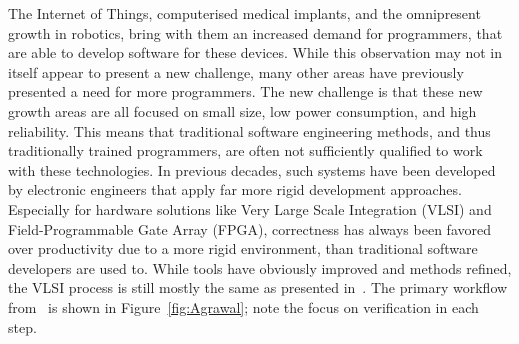 The Internet of Things, computerised medical implants, and the omnipresent growth in robotics, bring with them an increased demand for programmers, that are able to develop software for these devices. While this observation may not in itself appear to present a new challenge, many other areas have previously presented a need for more programmers. The new challenge is that these new growth areas are all focused on small size, low power consumption, and high reliability. This means that traditional software engineering methods, and thus traditionally trained programmers, are often not sufficiently qualified to work with these technologies.
In previous decades, such systems have been developed by electronic engineers that apply far more rigid development approaches. Especially for hardware solutions like Very Large Scale Integration (VLSI) and Field-Programmable Gate Array (FPGA), correctness has always been favored over productivity due to a more rigid environment, than traditional software developers are used to.
While tools have obviously improved and methods refined, the VLSI process is still mostly the same as presented in~\cite{Agrawal:1985:VDP:320599.322570}. The primary workflow from~\cite{Agrawal:1985:VDP:320599.322570} is shown in Figure~\ref{fig:Agrawal}; note the focus on verification in each step.
